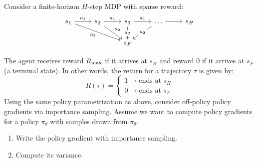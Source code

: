 \documentclass{article}
\begin{document}
\begin{enumerate}
\begin{enumerate}
    \begin{sol}
    \end{sol}

\end{enumerate}
\newpage
{} Consider a finite-horizon $H$-step MDP with sparse reward:
\[\begin{tikzcd}
	{s_1} & {s_2} & {s_3} & \dots & {s_H} \\
	&& {s_F}
	\arrow["{a_1}", from=1-1, to=1-2]
	\arrow["{a_1}", from=1-2, to=1-3]
	\arrow["{a_2}"', from=1-1, to=2-3]
	\arrow["{a_1}", from=1-3, to=1-4]
	\arrow[from=1-4, to=1-5]
	\arrow["{a_2}", from=1-2, to=2-3]
	\arrow["{a_2}"{description}, from=1-3, to=2-3]
	\arrow["{a_2}"{description}, from=1-4, to=2-3]
\end{tikzcd}\]

The agent receives reward $R_{\textrm{max}}$ if it arrives at $s_H$ and reward $0$ if it arrives at $s_F$ (a terminal state). In other words, the return for a trajectory $\tau$ is given by:
\[R(\tau) = \begin{cases}1 & \tau \textrm{ ends at } s_H \\ 0 & \tau \textrm{ ends at } s_F \end{cases}\]
Using the same policy parametrization as above, consider off-policy policy gradients via importance sampling. Assume we want to compute policy gradients for a policy $\pi_\theta$ with samples drawn from $\pi_{\theta'}$.
\begin{enumerate}
    \item Write the policy gradient with importance sampling.

    \begin{sol}
    \end{sol}

    \item Compute its variance.
    
    \begin{sol}
    \end{sol}

\end{enumerate}

\end{enumerate}
\end{document}
